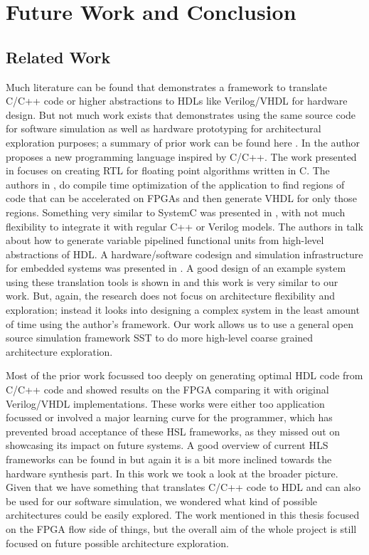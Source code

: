 \setcounter{equation}{0}

\chapter{Future Work and Conclusion }
\label{Future Work and Conclusion }
\section{Related Work}
Much literature can be found that demonstrates a framework to translate C/C++ code or higher abstractions to HDLs like Verilog/VHDL for hardware design. But not much work exists that demonstrates using the same source code for software simulation as well as hardware prototyping for architectural exploration purposes; a summary of prior work can be found here \cite{hls_overview}. In \cite{SAC} the author proposes a new programming language inspired by C/C++. The work presented in \cite{trident} focuses on creating RTL for floating point algorithms written in C. The authors in \cite{ROCC}, do compile time optimization of the application to find regions of code that can be accelerated on FPGAs and then generate VHDL for only those regions. Something very similar to SystemC was presented in \cite{reactivity}, with not much flexibility to integrate it with regular C++ or Verilog models. The authors in \cite{hls_pipeline} talk about how to generate variable pipelined functional units from high-level abstractions of HDL. A hardware/software codesign and simulation infrastructure for embedded systems was presented in \cite{hadi_dcim}. A good design of an example system using these translation tools is shown in \cite{piranha} and this work is very similar to our work. But, again, the research does not focus on architecture flexibility and exploration; instead it looks into designing a complex system in the least amount of time using the author's framework. Our work allows us to use a general open source simulation framework SST \cite{SST} to do more high-level coarse grained architecture exploration.
 
Most of the prior work focussed too deeply on generating optimal HDL code from C/C++ code and showed results on the FPGA comparing it with original Verilog/VHDL implementations. These works were either too application focussed or  involved a major learning curve for the programmer, which has prevented broad acceptance of these HSL frameworks, as they missed out on showcasing its impact on future systems. A good overview of current HLS frameworks can be found in \cite{hls_overview} but again it is a bit more inclined towards the hardware synthesis part. In this work we took a look at the broader picture. Given that we have something that translates C/C++ code to HDL and can also be used for our software simulation, we wondered what kind of possible architectures could be easily explored. The work mentioned in this thesis focused on the FPGA flow side of things, but the overall aim of the whole project is still focused on future possible architecture exploration.

